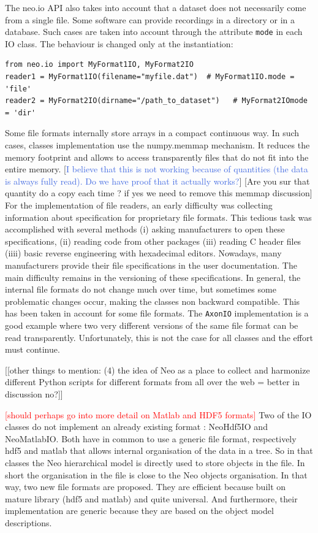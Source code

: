 \documentclass{frontiers}
\newcommand{\missing}[1]{\textcolor{red}{#1}}
\newcommand{\samuel}[1]{[\textcolor{RubineRed}{#1}]}
\newcommand{\robert}[1]{[\textcolor{RoyalBlue}{#1}]}
\begin{document}
The neo.io API also takes into account that a dataset does not necessarily come from a single file. Some software can provide recordings in a directory or in a database. Such cases are taken into account through the attribute \lstinline`mode` in each IO class. The behaviour is changed only at the instantiation:

\begin{lstlisting}[style=display]
from neo.io import MyFormat1IO, MyFormat2IO
reader1 = MyFormat1IO(filename="myfile.dat")  # MyFormat1IO.mode = 'file'
reader2 = MyFormat2IO(dirname="/path_to_dataset")   # MyFormat2IOmode = 'dir'
\end{lstlisting}

Some file formats internally store arrays in a compact continuous way. In such cases, classes implementation use the numpy.memmap mechanism. It reduces the memory footprint and allows to access transparently files that do not fit into the entire memory. \robert{I believe that this is not working because of quantities (the data is always fully read). Do we have proof that it actually works?} \samuel{Are you sur that quantity do a copy each time ? if yes we need to remove this memmap discussion}
For the implementation of file readers, an early difficulty was collecting information about specification for proprietary file formats. This tedious task was accomplished with several methods (i) asking manufacturers to open these specifications, (ii) reading code from other packages (iii) reading C header files (iiii) basic reverse engineering with hexadecimal editors. Nowadays, many manufacturers provide their file specifications in the user documentation.
The main difficulty remains in the versioning of these specifications. In general, the internal file formats do not change much over time, but sometimes some problematic changes occur, making the classes non backward compatible. This has been taken in account for some file formats. The \lstinline`AxonIO` implementation is a good example where two very different versions of the same file format can be read transparently. Unfortunately, this is not the case for all classes and the effort must continue.

\samuel{[other things to mention: (4) the idea of Neo as a place to collect and harmonize different Python scripts for different formats from all over the web = better in discussion no?]}


\missing{[should perhaps go into more detail on Matlab and HDF5 formats]}
Two of the IO classes do not implement an already existing format : NeoHdf5IO and NeoMatlabIO. Both have in common to use a generic file format, respectively hdf5 and matlab that allows internal organisation of the data in a tree. So in that classes the Neo hierarchical model is directly used to store objects in the file. In short the organisation in the file is close to the Neo objects organisation. In that way, two new file formats are proposed. They are efficient because built on mature library (hdf5 and matlab) and quite universal. And furthermore, their implementation are generic because they are based on the object model descriptions.
\end{document}
